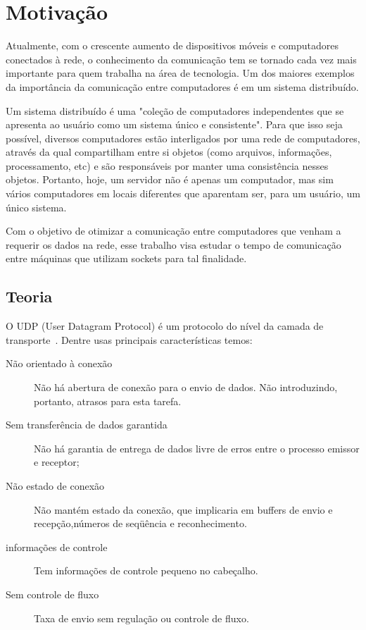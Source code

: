 \documentclass[10pt,a4paper]{article}
\begin{document}
\newpage


\section{Motivação}
Atualmente, com o crescente aumento de dispositivos móveis e computadores conectados à rede, o conhecimento da comunicação tem se tornado cada vez mais importante para quem trabalha na área de tecnologia. Um dos maiores exemplos da importância da comunicação entre computadores é em um sistema distribuído.

Um sistema distribuído é uma "coleção de computadores independentes que se apresenta ao usuário como um sistema único e consistente"\cite{AST}. Para que isso seja possível, diversos computadores estão interligados por uma rede de computadores, através da qual compartilham entre si objetos (como arquivos, informações, processamento, etc) e são responsáveis por manter uma consistência nesses objetos. 
Portanto, hoje, um servidor não é apenas um computador, mas sim vários
computadores em locais diferentes que aparentam ser, para um usuário,
um único sistema.

Com o objetivo de otimizar a comunicação entre computadores que venham
a requerir os dados na rede, esse trabalho visa estudar o tempo de
comunicação entre máquinas que utilizam sockets para tal finalidade.

\subsection{Teoria}
O UDP (User Datagram Protocol) é um protocolo do nível da camada de
transporte~\cite{Kurose05}. Dentre usas principais características temos:

\begin{description}
\item[Não orientado à conexão]  Não há abertura de conexão para o envio de dados. Não introduzindo, portanto, atrasos para esta tarefa.
\item[Sem transferência de dados garantida] Não há garantia de entrega
  de dados livre de erros entre o processo emissor e receptor; 
\item[Não estado de conexão] Não mantém estado da conexão, que implicaria em buffers de envio e recepção,números de seqüência e reconhecimento.
\item[informações de controle] Tem informações de controle pequeno no cabeçalho.
\item[ Sem controle de fluxo] Taxa de envio sem regulação ou controle de fluxo.

\end{description}
\end{document}
